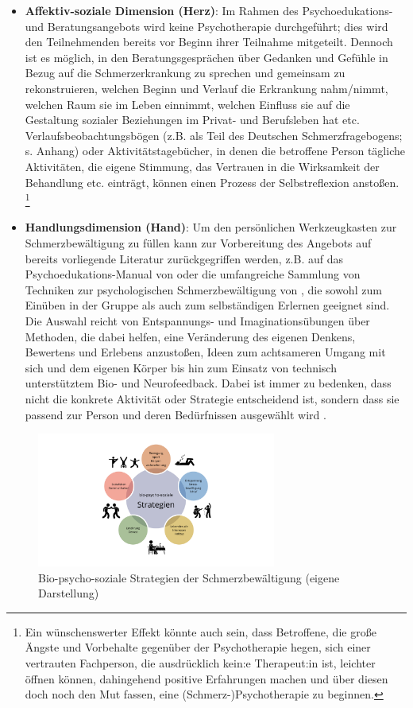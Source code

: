 \documentclass[
  twoside,
  parskip=half-,
]{scrreprt}
\begin{document}
\begin{praxis}
\begin{itemize}
  \item \textbf{Affektiv-soziale Dimension (Herz)}: Im Rahmen des Psychoedukations- und Beratungsangebots wird keine Psychotherapie durchgeführt; dies wird den Teilnehmenden bereits vor Beginn ihrer Teilnahme mitgeteilt. Dennoch ist es möglich, in den Beratungsgesprächen über Gedanken und Gefühle in Bezug auf die Schmerzerkrankung zu sprechen und gemeinsam zu rekonstruieren, welchen Beginn und Verlauf die Erkrankung nahm/nimmt, welchen Raum sie im Leben einnimmt, welchen Einfluss sie auf die Gestaltung sozialer Beziehungen im Privat- und Berufsleben hat etc. Verlaufsbeobachtungsbögen (z.B. als Teil des Deutschen Schmerzfragebogens; s. Anhang) oder Aktivitätstagebücher, in denen die betroffene Person tägliche Aktivitäten, die eigene Stimmung, das Vertrauen in die Wirksamkeit der Behandlung etc. einträgt, können einen Prozess der Selbstreflexion anstoßen. \footnote{Ein wünschenswerter Effekt könnte auch sein, dass Betroffene, die große Ängste und Vorbehalte gegenüber der Psychotherapie hegen, sich einer vertrauten Fachperson, die ausdrücklich kein:e Therapeut:in ist, leichter öffnen können, dahingehend positive Erfahrungen machen und über diesen  doch noch den Mut fassen, eine (Schmerz-)Psychotherapie zu beginnen.}
  \item \textbf{Handlungsdimension (Hand)}: Um den persönlichen Werkzeugkasten zur Schmerzbewältigung zu füllen kann zur Vorbereitung des Angebots auf bereits vorliegende Literatur zurückgegriffen werden, z.B. auf das Psychoedukations-Manual von \textcite{wachter} oder die umfangreiche Sammlung von Techniken zur psychologischen Schmerzbewältigung von \citeauthor{richter}, die sowohl zum Einüben in der Gruppe als auch zum selbständigen Erlernen geeignet sind. Die Auswahl reicht von Entspannungs- und Imaginationsübungen über Methoden, die dabei helfen, eine Veränderung des eigenen Denkens, Bewertens und Erlebens anzustoßen, Ideen zum achtsameren Umgang mit sich und dem eigenen Körper bis hin zum Einsatz von technisch unterstütztem Bio- und Neurofeedback. Dabei ist immer zu bedenken, dass nicht die konkrete Aktivität oder Strategie entscheidend ist, sondern dass sie passend zur Person und deren Bedürfnissen ausgewählt wird \autocite[vgl.][336]{HeftSchmerz5}.
\end{itemize}
\end{praxis}

\begin{figure}
  \centering
  \includegraphics[width=0.7\textwidth]{Grafiken/Strategien.pdf}
  \caption{Bio-psycho-soziale Strategien der Schmerzbewältigung (eigene Darstellung)}
  \label{fig:biopsychosozial}
\end{figure}
\end{document}
